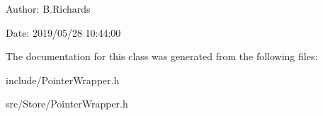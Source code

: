 \begin{DoxyParagraph}{Author\-:}
B.\-Richards 
\end{DoxyParagraph}
\begin{DoxyParagraph}{Date\-:}
2019/05/28 10\-:44\-:00 
\end{DoxyParagraph}


The documentation for this class was generated from the following files\-:\begin{DoxyCompactItemize}
\item 
include/Pointer\-Wrapper.\-h\item 
src/\-Store/Pointer\-Wrapper.\-h\end{DoxyCompactItemize}
